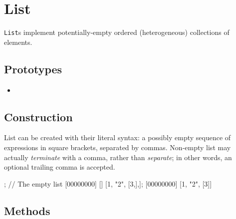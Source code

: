 \section{List}

\lstinline|List|s implement potentially-empty ordered (heterogeneous)
collections of elements.

\subsection{Prototypes}

\begin{itemize}
\item {}
\end{itemize}

\subsection{Construction}

List can be created with their literal syntax: a possibly empty
sequence of expressions in square brackets, separated by commas.
Non-empty list may actually \emph{terminate} with a comma, rather than
\emph{separate}; in other words, an optional trailing comma is accepted.

\begin{urbiscript}
[]; // The empty list
[00000000] []
[1, "2", [3,],];
[00000000] [1, "2", [3]]
\end{urbiscript}

\subsection{Methods}

